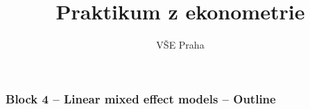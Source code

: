 \documentclass{beamer}
\title[Block 4]{Praktikum z ekonometrie} %
\author{VŠE Praha} %
\institute[4EK417] %
{
\medskip
\textit{Tomáš Formánek} %
}
\date{} %
\begin{document}
\begin{frame}
\titlepage %
\end{frame}
\begin{frame}
\frametitle{Block 4 – Linear mixed effect models – Outline
} %
\tableofcontents %
\end{frame}

\end{document}
